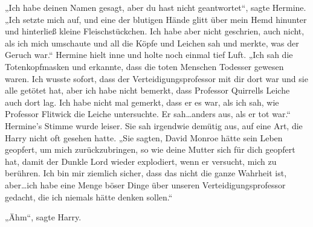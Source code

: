 „Ich habe deinen Namen gesagt, aber du hast nicht geantwortet“, sagte Hermine. „Ich setzte mich auf, und eine der blutigen Hände glitt über mein Hemd hinunter und hinterließ kleine Fleischstückchen. Ich habe aber nicht geschrien, auch nicht, als ich mich umschaute und all die Köpfe und Leichen sah und merkte, was der Geruch war.“ Hermine hielt inne und holte noch einmal tief Luft. „Ich sah die Totenkopfmasken und erkannte, dass die toten Menschen Todesser gewesen waren. Ich wusste sofort, dass der Verteidigungsprofessor mit dir dort war und sie alle getötet hat, aber ich habe nicht bemerkt, dass Professor Quirrells Leiche auch dort lag. Ich habe nicht mal gemerkt, dass er es war, als ich sah, wie Professor Flitwick die Leiche untersuchte. Er sah…anders aus, als er tot war.“
Hermine’s Stimme wurde leiser. Sie sah irgendwie demütig aus, auf eine Art, die Harry nicht oft gesehen hatte.
„Sie sagten, David Monroe hätte sein Leben geopfert, um mich zurückzubringen, so wie deine Mutter sich für dich geopfert hat, damit der Dunkle Lord wieder explodiert, wenn er versucht, mich zu berühren. Ich bin mir ziemlich sicher, dass das nicht die ganze Wahrheit ist, aber…ich habe eine Menge böser Dinge über unseren Verteidigungsprofessor gedacht, die ich niemals hätte denken sollen.“

„Ähm“, sagte Harry.

